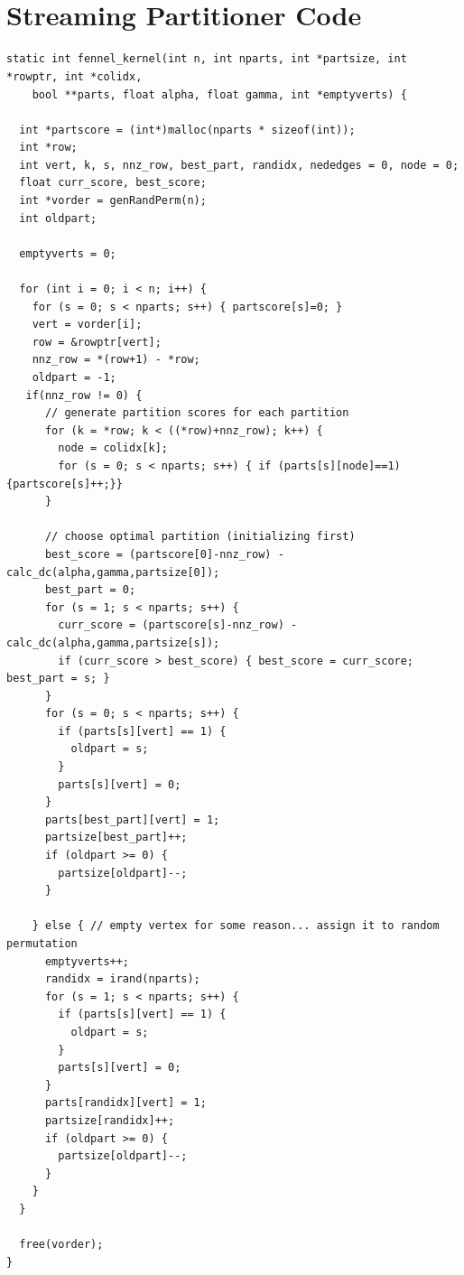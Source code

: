 \documentclass[11pt]{article}
\begin{document}
\newpage
\appendix
\section{\\Streaming Partitioner Code} \label{App:AppendixA}

\begin{verbatim}
static int fennel_kernel(int n, int nparts, int *partsize, int *rowptr, int *colidx,
    bool **parts, float alpha, float gamma, int *emptyverts) {
      
  int *partscore = (int*)malloc(nparts * sizeof(int));
  int *row;
  int vert, k, s, nnz_row, best_part, randidx, nededges = 0, node = 0;
  float curr_score, best_score;
  int *vorder = genRandPerm(n);
  int oldpart;

  emptyverts = 0;

  for (int i = 0; i < n; i++) {
    for (s = 0; s < nparts; s++) { partscore[s]=0; }
    vert = vorder[i];
    row = &rowptr[vert];
    nnz_row = *(row+1) - *row;
    oldpart = -1;
   if(nnz_row != 0) {
      // generate partition scores for each partition
      for (k = *row; k < ((*row)+nnz_row); k++) {
        node = colidx[k];
        for (s = 0; s < nparts; s++) { if (parts[s][node]==1) {partscore[s]++;}}
      }
        
      // choose optimal partition (initializing first)
      best_score = (partscore[0]-nnz_row) - calc_dc(alpha,gamma,partsize[0]);
      best_part = 0;
      for (s = 1; s < nparts; s++) {
        curr_score = (partscore[s]-nnz_row) - calc_dc(alpha,gamma,partsize[s]);
        if (curr_score > best_score) { best_score = curr_score; best_part = s; }
      }
      for (s = 0; s < nparts; s++) { 
        if (parts[s][vert] == 1) {
          oldpart = s;
        }
        parts[s][vert] = 0; 
      }
      parts[best_part][vert] = 1;
      partsize[best_part]++;
      if (oldpart >= 0) {
        partsize[oldpart]--;
      }
      
    } else { // empty vertex for some reason... assign it to random permutation
      emptyverts++;
      randidx = irand(nparts);
      for (s = 1; s < nparts; s++) {
        if (parts[s][vert] == 1) {
          oldpart = s;
        }
        parts[s][vert] = 0; 
      }
      parts[randidx][vert] = 1;
      partsize[randidx]++;
      if (oldpart >= 0) {
        partsize[oldpart]--;
      }
    }
  }
  
  free(vorder);
}
\end{verbatim}
\end{document}
